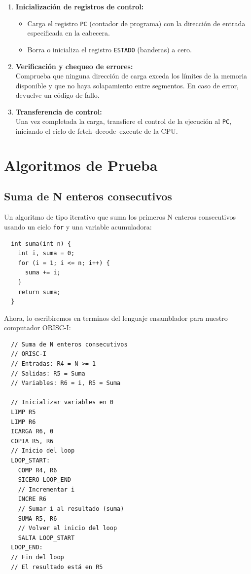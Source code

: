 \documentclass{article}
\begin{document}
\begin{enumerate}
  \item \textbf{Inicialización de registros de control:}\\
        \begin{itemize}
          \item Carga el registro \texttt{PC} (contador de programa) con la dirección de entrada especificada en la cabecera.
          \item Borra o inicializa el registro \texttt{ESTADO} (banderas) a cero.
        \end{itemize}

  \item \textbf{Verificación y chequeo de errores:}\\
        Comprueba que ninguna dirección de carga exceda los límites de la memoria disponible y que no haya solapamiento entre segmentos. En caso de error, devuelve un código de fallo.

  \item \textbf{Transferencia de control:}\\
        Una vez completada la carga, transfiere el control de la ejecución al \texttt{PC}, iniciando el ciclo de fetch–decode–execute de la CPU.
\end{enumerate}


\section{Algoritmos de Prueba}

\subsection{Suma de N enteros consecutivos}

Un algoritmo de tipo iterativo que suma los primeros N enteros
consecutivos usando un ciclo \texttt{for} y una variable acumuladora:

\begin{verbatim}
  int suma(int n) {
    int i, suma = 0;
    for (i = 1; i <= n; i++) {
      suma += i;
    }
    return suma;
  }
\end{verbatim}

Ahora, lo escribiremos en terminos del lenguaje ensamblador para nuestro computador ORISC-I:

\begin{verbatim}
  // Suma de N enteros consecutivos
  // ORISC-I
  // Entradas: R4 = N >= 1
  // Salidas: R5 = Suma
  // Variables: R6 = i, R5 = Suma

  // Inicializar variables en 0
  LIMP R5
  LIMP R6
  ICARGA R6, 0
  COPIA R5, R6
  // Inicio del loop
  LOOP_START:
    COMP R4, R6
    SICERO LOOP_END
    // Incrementar i
    INCRE R6
    // Sumar i al resultado (suma)
    SUMA R5, R6
    // Volver al inicio del loop
    SALTA LOOP_START
  LOOP_END:
  // Fin del loop
  // El resultado está en R5
\end{verbatim}
\end{document}
